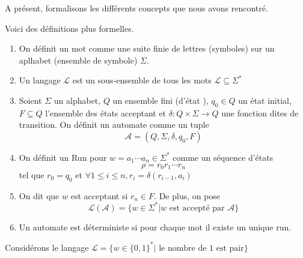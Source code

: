 A présent, formalisons les différents concepts que nous avons rencontré.
\begin{definition}
Voici des définitions plus formelles.
\begin{enumerate}

    \item On définit un mot comme une suite finie de lettres (symboles) sur un aplhabet (ensemble de symbole) $\Sigma$.
    \item Un langage $\mathcal{L}$ est un sous-ensemble de tous les mots $\mathcal{L} \subseteq \Sigma^*$
    \item Soient $\Sigma$ un alphabet, $Q$ un ensemble fini (d'état ), $q_0\in Q$ un état initial, $F\subseteq Q$ l'ensemble des états acceptant et $\delta: Q\times \Sigma \to Q$ une fonction dites de transition. On définit un automate comme un tuple  $$\mathcal{A}= (Q, \Sigma, \delta, q_0, F)$$
    \item On définit un Run pour $w=a_1\cdots a_n\in \Sigma^*$ comme un séquence d'états $$\rho=r_0r_1\cdots r_n$$ tel que $r_0=q_0$ et $\forall 1\leq i \leq n, r_i = \delta(r_{i-1},a_i)$
    \item On dit que $w$ est acceptant si $r_n \in F$. De plus, on pose 
    $$
    \mathcal{L}(\mathcal{A})= \{w\in \Sigma^* | w \text{ est accepté par } \mathcal{A}\} 
    $$
    \item Un automate est déterministe si pour chaque mot il existe un unique run.


\end{enumerate}

\end{definition}

\begin{exemple}
   Considérons le langage $\mathcal{L}= \{w\in \{0,1\}^* | \text{ le nombre de 1 est pair}\}$
\end{exemple}


